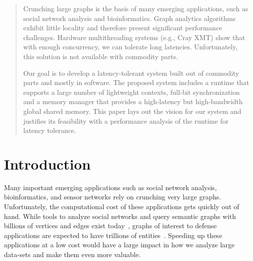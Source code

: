 \documentclass[10pt,nocopyrightspace]{sigplanconf}
\begin{document}
\thispagestyle{empty}
\pagestyle{empty}


\begin{abstract}
   Crunching large graphs is the basis of many emerging applications,
   such as social network analysis and bioinformatics. Graph analytics
   algorithms exhibit little locality and therefore present significant
   performance challenges. Hardware multithreading systems (e.g., Cray
   {\small XMT}) show that with enough concurrency, we can tolerate long
   latencies. Unfortunately, this solution is not available with
   commodity parts.
 
   Our goal is to develop a latency-tolerant system built out of
   commodity parts and mostly in software. The proposed system includes
   a runtime that supports a large number of lightweight contexts,
   full-bit synchronization and a memory manager that provides a
   high-latency but high-bandwidth global shared memory. This paper
   lays out the vision for our system and justifies its feasibility
   with a performance analysis of the runtime for latency tolerance.
 
\end{abstract}

\renewcommand{\baselinestretch}{0.8}

\section{Introduction}

Many important emerging applications such as social network analysis,
bioinformatics, and sensor networks rely on crunching very large
graphs. Unfortunately, the computational cost of these applications
gets quickly out of hand. While tools to analyze social networks and
query semantic graphs with billions of vertices and edges exist
today~\cite{joslyn:hpsf, ediger:msda, brocheler:cosi, pegasus,
  pregel}, graphs of interest to defense applications are expected to
have trillions of entities~\cite{hartley:mssg, kolda:imkd}. Speeding
up these applications at a low cost would have a large impact in how
we analyze large data-sets and make them even more valuable.




\end{document}

